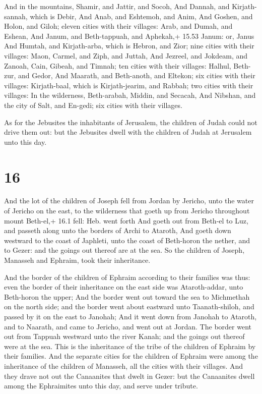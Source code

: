  And in the mountains, Shamir, and Jattir, and Socoh,
 And Dannah, and Kirjath-sannah, which is Debir,
 And Anab, and Eshtemoh, and Anim,  And
Goshen, and Holon, and Giloh; eleven cities with their villages:
 Arab, and Dumah, and Eshean,  And Janum, and
Beth-tappuah, and Aphekah,+ 15.53 Janum: or, Janus  And
Humtah, and Kirjath-arba, which is Hebron, and Zior; nine cities with
their villages:  Maon, Carmel, and Ziph, and Juttah,
 And Jezreel, and Jokdeam, and Zanoah,  Cain,
Gibeah, and Timnah; ten cities with their villages: 
Halhul, Beth-zur, and Gedor,  And Maarath, and Beth-anoth,
and Eltekon; six cities with their villages:  Kirjath-baal,
which is Kirjath-jearim, and Rabbah; two cities with their villages:
 In the wilderness, Beth-arabah, Middin, and Secacah,
 And Nibshan, and the city of Salt, and En-gedi; six cities
with their villages.

 As for the Jebusites the inhabitants of Jerusalem, the
children of Judah could not drive them out: but the Jebusites dwell with
the children of Judah at Jerusalem unto this day.

\hypertarget{section-15}{%
\section{16}\label{section-15}}

 And the lot of the children of Joseph fell from Jordan by
Jericho, unto the water of Jericho on the east, to the wilderness that
goeth up from Jericho throughout mount Beth-el,+ 16.1 fell: Heb. went
forth  And goeth out from Beth-el to Luz, and passeth along
unto the borders of Archi to Ataroth,  And goeth down
westward to the coast of Japhleti, unto the coast of Beth-horon the
nether, and to Gezer: and the goings out thereof are at the sea.
 So the children of Joseph, Manasseh and Ephraim, took their
inheritance.

 And the border of the children of Ephraim according to
their families was thus: even the border of their inheritance on the
east side was Ataroth-addar, unto Beth-horon the upper;  And
the border went out toward the sea to Michmethah on the north side; and
the border went about eastward unto Taanath-shiloh, and passed by it on
the east to Janohah;  And it went down from Janohah to
Ataroth, and to Naarath, and came to Jericho, and went out at Jordan.
 The border went out from Tappuah westward unto the river
Kanah; and the goings out thereof were at the sea. This is the
inheritance of the tribe of the children of Ephraim by their families.
 And the separate cities for the children of Ephraim were
among the inheritance of the children of Manasseh, all the cities with
their villages.  And they drave not out the Canaanites that
dwelt in Gezer: but the Canaanites dwell among the Ephraimites unto this
day, and serve under tribute.

